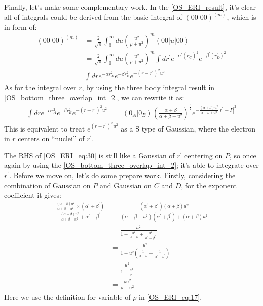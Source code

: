 Finally, let's make some complementary work. In the \ref{OS_ERI_result},
it's clear all of integrals could be derived from the basic integral of
$(00|00)^{(m)}$, which is in form of:
\begin{equation}
 \begin{split}
 (00|00)^{(m)} &= \frac{2}{\sqrt{\pi}} \int_{0}^{\infty} du \left( \frac{u^{2}}
{\rho+u^{2}}\right)^{m} (00|u|00) \\
&=\frac{2}{\sqrt{\pi}} \int_{0}^{\infty} du \left( \frac{u^{2}}
{\rho+u^{2}}\right)^{m} 
\int dr^{'}  e^{-\alpha^{'} (r^{'}_{C})^{2}}e^{-\beta^{'} (r^{'}_{D})^{2}} \\
&\int dr  e^{-\alpha r_{A}^{2}} e^{-\beta r_{B}^{2}} e^{-(r-r^{'})^{2}u^{2}} 
\end{split}
\end{equation}
As for the integral over $r$, by using the three body integral result in
\ref{OS_bottom_three_overlap_int_2}, we can rewrite it as:
\begin{equation}
 \begin{split}
  \int dr  e^{-\alpha r_{A}^{2}} e^{-\beta r_{B}^{2}} e^{-(r-r^{'})^{2}u^{2}} &=
  (0_{A}|0_{B})\left( \frac{\alpha+\beta}{\alpha+\beta+u^{2}}\right)^{\frac{3}{2}}
e^{-\frac{(\alpha+\beta)u^{2}}{\alpha+\beta+u^{2}}|r^{'}-P|^{2}} 
 \end{split}
 \label{OS_ERI_eq:30}
\end{equation}
This is equivalent to treat $e^{(r-r^{'})^{2}u^{2}}$ as a S type of Gaussian, where
the electron in $r$ centers on ``nuclei'' of $r^{'}$.

The RHS of \ref{OS_ERI_eq:30} is still like a Gaussian of $r^{'}$ centering
on $P$, so once again by using the \ref{OS_bottom_three_overlap_int_2};
it's able to integrate over $r^{'}$. Before we move on, let's do some prepare
work. Firstly, considering the combination of Gaussian on $P$ and Gaussian
on $C$ and $D$, for the exponent coefficient it gives:
\begin{equation}
 \begin{split}
  \frac{\frac{(\alpha+\beta)u^{2}}{\alpha+\beta+u^{2}}\times
  (\alpha^{'}+\beta^{'})}{\frac{(\alpha+\beta)u^{2}}{\alpha+\beta+u^{2}} 
  +\alpha^{'}+\beta^{'}} 
  &= \frac{(\alpha^{'}+\beta^{'})(\alpha+\beta)u^{2}}
  {(\alpha+\beta+u^{2})(\alpha^{'}+\beta^{'})+(\alpha+\beta)u^{2}} \\
  &= \frac{u^{2}}{1+\frac{u^{2}}{\alpha+\beta}+\frac{u^{2}}{\alpha^{'}+\beta^{'}}} \\
  &= \frac{u^{2}}{1+u^{2}\left( \frac{1}{\alpha+\beta}+\frac{1}{\alpha^{'}+\beta^{'}}
  \right) } \\
  &= \frac{u^{2}}{1+\frac{u^{2}}{\rho}} \\
  &= \frac{\rho u^{2}}{\rho+ u^{2}}
 \end{split}
 \label{OS_ERI_eq:31}
 \end{equation}
 Here we use the definition for variable of $\rho$ in \ref{OS_ERI_eq:17}.
 
